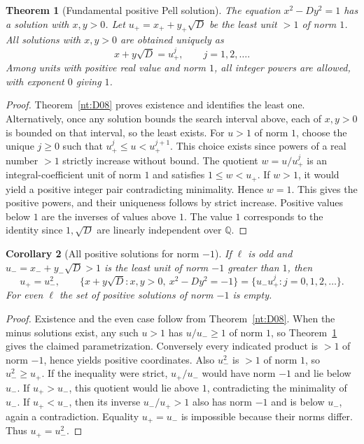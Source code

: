 \documentclass[11pt,oneside,openany]{book}
\theoremstyle{plain}
\newtheorem{theorem}{Theorem}[chapter]
\newtheorem{corollary}[theorem]{Corollary}
\theoremstyle{definition}
\theoremstyle{remark}
\begin{document}
\begin{theorem}[Fundamental positive Pell solution]\label{nt:D07}
The equation \(x^2-Dy^2=1\) has a solution with \(x,y>0\).
Let \(u_+=x_++y_+\sqrt D\) be the least unit \(>1\) of norm \(1\).
All solutions with \(x,y>0\) are obtained uniquely as
\[
 x+y\sqrt D=u_+^j,\qquad j=1,2,\ldots .
\]
Among units with positive real value and norm \(1\), all integer
powers are allowed, with exponent \(0\) giving \(1\).
\end{theorem}
\begin{proof}
Theorem~\ref{nt:D08} proves existence and identifies the least one.
Alternatively, once any solution bounds the search interval above,
each of \(x,y>0\) is bounded on that interval, so the least exists.
For \(u>1\) of norm \(1\), choose the unique \(j\ge0\) such that
\(u_+^j\le u<u_+^{j+1}\). This choice exists since powers of a real
number \(>1\) strictly increase without bound. The quotient
\(w=u/u_+^j\) is an integral-coefficient unit of norm \(1\) and
satisfies \(1\le w<u_+\). If \(w>1\), it would yield a positive
integer pair contradicting minimality. Hence \(w=1\).
This gives the positive powers, and their uniqueness follows by
strict increase. Positive values below \(1\) are the inverses of
values above \(1\). The value \(1\) corresponds to the identity
since \(1,\sqrt D\) are linearly independent over \(\mathbb Q\).
\end{proof}

\begin{corollary}[All positive solutions for norm \(-1\)]
\label{cor:nt-pell-minus}
If \(\ell\) is odd and \(u_-=x_-+y_-\sqrt D>1\) is the least
unit of norm \(-1\) greater than \(1\), then
\[
 u_+ = u_-^2,\qquad
 \{x+y\sqrt D:x,y>0,\ x^2-Dy^2=-1\}
   =\{u_-u_+^j:j=0,1,2,\ldots\}.
\]
For even \(\ell\) the set of positive solutions of norm \(-1\) is
empty.
\end{corollary}
\begin{proof}
Existence and the even case follow from Theorem~\ref{nt:D08}.
When the minus solutions exist, any such \(u>1\) has \(u/u_-\ge1\)
of norm \(1\), so Theorem~\ref{nt:D07} gives the claimed
parametrization. Conversely every indicated product is \(>1\) of
norm \(-1\), hence yields positive coordinates. Also \(u_-^2\) is
\(>1\) of norm \(1\), so \(u_-^2\ge u_+\).
If the inequality were strict, \(u_+/u_-\) would have norm \(-1\)
and lie below \(u_-\). If \(u_+>u_-\), this quotient would lie above
\(1\), contradicting
the minimality of \(u_-\). If \(u_+<u_-\), then its inverse
\(u_-/u_+>1\) also has norm \(-1\) and is below \(u_-\),
again a contradiction. Equality \(u_+=u_-\) is impossible because
their norms differ. Thus \(u_+=u_-^2\).
\end{proof}
\end{document}
